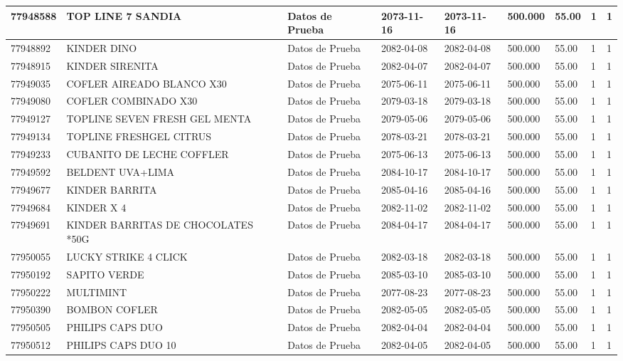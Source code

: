 \documentclass[a4paper,12pt]{article}
\begin{document}
\begin{landscape}
\begin{longtable}{|p{4cm}|p{2.5cm}|p{2.5cm}|p{1.8cm}|p{1.8cm}|p{1cm}|p{1cm}|p{3cm}|p{3cm}||}
77948588 & TOP LINE 7 SANDIA & Datos de Prueba & 2073-11-16 & 2073-11-16 & 500.000 & 55.00 & 1 & 1 \\ \hline 
77948892 & KINDER DINO & Datos de Prueba & 2082-04-08 & 2082-04-08 & 500.000 & 55.00 & 1 & 1 \\ \hline 
77948915 & KINDER SIRENITA & Datos de Prueba & 2082-04-07 & 2082-04-07 & 500.000 & 55.00 & 1 & 1 \\ \hline 
77949035 & COFLER AIREADO BLANCO X30 & Datos de Prueba & 2075-06-11 & 2075-06-11 & 500.000 & 55.00 & 1 & 1 \\ \hline 
77949080 & COFLER COMBINADO X30 & Datos de Prueba & 2079-03-18 & 2079-03-18 & 500.000 & 55.00 & 1 & 1 \\ \hline 
77949127 & TOPLINE SEVEN FRESH GEL MENTA & Datos de Prueba & 2079-05-06 & 2079-05-06 & 500.000 & 55.00 & 1 & 1 \\ \hline 
77949134 & TOPLINE FRESHGEL CITRUS & Datos de Prueba & 2078-03-21 & 2078-03-21 & 500.000 & 55.00 & 1 & 1 \\ \hline 
77949233 & CUBANITO DE LECHE COFFLER & Datos de Prueba & 2075-06-13 & 2075-06-13 & 500.000 & 55.00 & 1 & 1 \\ \hline 
77949592 & BELDENT UVA+LIMA & Datos de Prueba & 2084-10-17 & 2084-10-17 & 500.000 & 55.00 & 1 & 1 \\ \hline 
77949677 & KINDER   BARRITA & Datos de Prueba & 2085-04-16 & 2085-04-16 & 500.000 & 55.00 & 1 & 1 \\ \hline 
77949684 & KINDER X 4 & Datos de Prueba & 2082-11-02 & 2082-11-02 & 500.000 & 55.00 & 1 & 1 \\ \hline 
77949691 & KINDER BARRITAS DE CHOCOLATES *50G & Datos de Prueba & 2084-04-17 & 2084-04-17 & 500.000 & 55.00 & 1 & 1 \\ \hline 
77950055 & LUCKY STRIKE 4 CLICK & Datos de Prueba & 2082-03-18 & 2082-03-18 & 500.000 & 55.00 & 1 & 1 \\ \hline 
77950192 & SAPITO VERDE & Datos de Prueba & 2085-03-10 & 2085-03-10 & 500.000 & 55.00 & 1 & 1 \\ \hline 
77950222 & MULTIMINT & Datos de Prueba & 2077-08-23 & 2077-08-23 & 500.000 & 55.00 & 1 & 1 \\ \hline 
77950390 & BOMBON COFLER & Datos de Prueba & 2082-05-05 & 2082-05-05 & 500.000 & 55.00 & 1 & 1 \\ \hline 
77950505 & PHILIPS CAPS DUO & Datos de Prueba & 2082-04-04 & 2082-04-04 & 500.000 & 55.00 & 1 & 1 \\ \hline 
77950512 & PHILIPS CAPS DUO 10 & Datos de Prueba & 2082-04-05 & 2082-04-05 & 500.000 & 55.00 & 1 & 1 \\ \hline 

\end{longtable}
\end{landscape}
\end{document}
